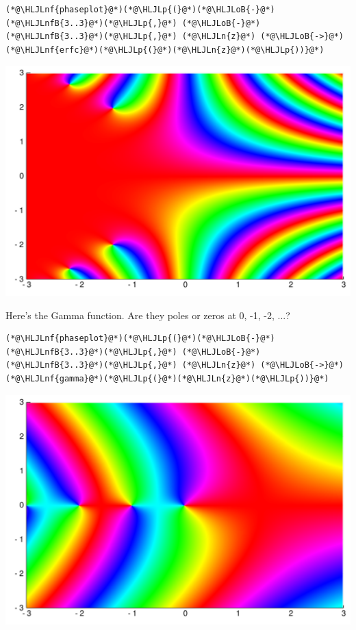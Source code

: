 \documentclass[12pt,a4paper]{article}
\newcommand{\HLJLn}[1]{#1}
\newcommand{\HLJLnf}[1]{\textcolor[RGB]{66,102,213}{#1}}
\newcommand{\HLJLnfB}[1]{\textcolor[RGB]{59,151,46}{#1}}
\newcommand{\HLJLoB}[1]{\textcolor[RGB]{102,102,102}{\textbf{#1}}}
\newcommand{\HLJLp}[1]{#1}
\begin{document}
\begin{lstlisting}
(*@\HLJLnf{phaseplot}@*)(*@\HLJLp{(}@*)(*@\HLJLoB{-}@*)(*@\HLJLnfB{3..3}@*)(*@\HLJLp{,}@*) (*@\HLJLoB{-}@*)(*@\HLJLnfB{3..3}@*)(*@\HLJLp{,}@*) (*@\HLJLn{z}@*) (*@\HLJLoB{->}@*) (*@\HLJLnf{erfc}@*)(*@\HLJLp{(}@*)(*@\HLJLn{z}@*)(*@\HLJLp{))}@*)
\end{lstlisting}

\includegraphics[width=\linewidth]{figures/Lecture1_14_1.pdf}

Here's the Gamma function. Are they poles or zeros at 0, -1, -2, ...?


\begin{lstlisting}
(*@\HLJLnf{phaseplot}@*)(*@\HLJLp{(}@*)(*@\HLJLoB{-}@*)(*@\HLJLnfB{3..3}@*)(*@\HLJLp{,}@*) (*@\HLJLoB{-}@*)(*@\HLJLnfB{3..3}@*)(*@\HLJLp{,}@*) (*@\HLJLn{z}@*) (*@\HLJLoB{->}@*) (*@\HLJLnf{gamma}@*)(*@\HLJLp{(}@*)(*@\HLJLn{z}@*)(*@\HLJLp{))}@*)
\end{lstlisting}

\includegraphics[width=\linewidth]{figures/Lecture1_15_1.pdf}
\end{document}
